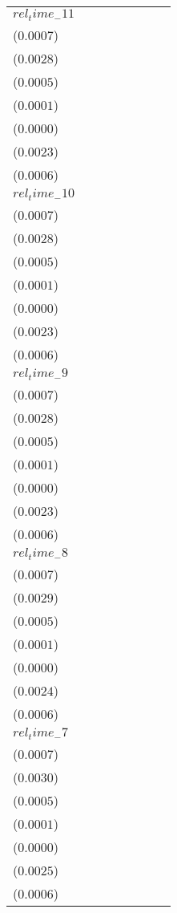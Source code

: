 \begin{tabular}{llllllll}
$rel_time_-11$ & \makecell{$-0.0017^{**}$ \\ ($0.0007$)} & \makecell{$-0.0074^{***}$ \\ ($0.0028$)} & \makecell{$0.0004^{}$ \\ ($0.0005$)} & \makecell{$0.0000^{}$ \\ ($0.0001$)} & \makecell{$0.0000^{}$ \\ ($0.0000$)} & \makecell{$-0.0051^{**}$ \\ ($0.0023$)} & \makecell{$-0.0013^{**}$ \\ ($0.0006$)} \\
$rel_time_-10$ & \makecell{$-0.0004^{}$ \\ ($0.0007$)} & \makecell{$-0.0020^{}$ \\ ($0.0028$)} & \makecell{$0.0004^{}$ \\ ($0.0005$)} & \makecell{$0.0000^{}$ \\ ($0.0001$)} & \makecell{$0.0000^{}$ \\ ($0.0000$)} & \makecell{$-0.0010^{}$ \\ ($0.0023$)} & \makecell{$-0.0002^{}$ \\ ($0.0006$)} \\
$rel_time_-9$ & \makecell{$-0.0020^{***}$ \\ ($0.0007$)} & \makecell{$-0.0073^{***}$ \\ ($0.0028$)} & \makecell{$-0.0001^{}$ \\ ($0.0005$)} & \makecell{$-0.0000^{}$ \\ ($0.0001$)} & \makecell{$0.0000^{}$ \\ ($0.0000$)} & \makecell{$-0.0063^{***}$ \\ ($0.0023$)} & \makecell{$-0.0016^{***}$ \\ ($0.0006$)} \\
$rel_time_-8$ & \makecell{$-0.0021^{***}$ \\ ($0.0007$)} & \makecell{$-0.0099^{***}$ \\ ($0.0029$)} & \makecell{$-0.0006^{}$ \\ ($0.0005$)} & \makecell{$-0.0001^{*}$ \\ ($0.0001$)} & \makecell{$-0.0000^{}$ \\ ($0.0000$)} & \makecell{$-0.0086^{***}$ \\ ($0.0024$)} & \makecell{$-0.0021^{***}$ \\ ($0.0006$)} \\
$rel_time_-7$ & \makecell{$-0.0005^{}$ \\ ($0.0007$)} & \makecell{$-0.0022^{}$ \\ ($0.0030$)} & \makecell{$0.0006^{}$ \\ ($0.0005$)} & \makecell{$0.0000^{}$ \\ ($0.0001$)} & \makecell{$0.0000^{}$ \\ ($0.0000$)} & \makecell{$-0.0019^{}$ \\ ($0.0025$)} & \makecell{$-0.0006^{}$ \\ ($0.0006$)} \\

\end{tabular}
